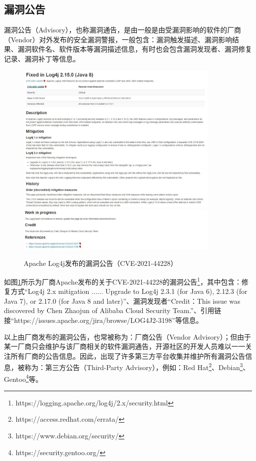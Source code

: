\subsection{漏洞公告} 
漏洞公告（Advisory），也称漏洞通告，是由一般是由受漏洞影响的软件的厂商（Vendor）对外发布的安全漏洞警报，一般包含：漏洞触发描述、漏洞影响结果、漏洞软件名、软件版本等漏洞描述信息，有时也会包含漏洞发现者、漏洞修复记录、漏洞补丁等信息。

\begin{figure}[h]
    \centering
    \includegraphics[width=0.88\textwidth]{fig/Vendor-2021-44228}
    \includegraphics[width=0.88\textwidth]{fig/Vendor-2021-44228-2}
    \caption{Apache Log4j发布的漏洞公告（CVE-2021-44228）}
    \label{fig:Vendor-2021-44228}
\end{figure}

如图\ref{fig:Vendor-2021-44228}所示为厂商Apache发布的关于CVE-2021-44228的漏洞公告\footnote{https://logging.apache.org/log4j/2.x/security.html}，其中包含：修复方式“Log4j 2.x mitigation ...... Upgrade to Log4j 2.3.1 (for Java 6), 2.12.3 (for Java 7), or 2.17.0 (for Java 8 and later)”、漏洞发现者“Credit：This issue was discovered by Chen Zhaojun of Alibaba Cloud Security Team.”、引用链接“https://issues.apache.org/jira/browse/LOG4J2-3198”等信息。


以上由厂商发布的漏洞公告，也常被称为：厂商公告（Vendor Advisory）；但由于某一厂商只会维护与该厂商相关的软件漏洞通告，开源社区的开发人员难以一一关注所有厂商的公告信息。因此，出现了许多第三方平台收集并维护所有漏洞公告信息，被称为：第三方公告（Third-Party Advisory），例如：Red Hat\footnote{https://access.redhat.com/errata/}、Debian\footnote{https://www.debian.org/security/}、Gentoo\footnote{https://security.gentoo.org/}等。

